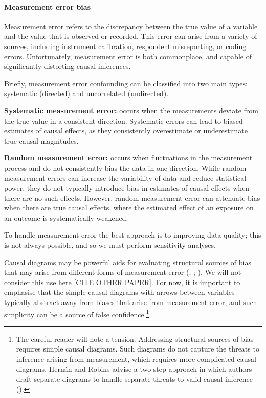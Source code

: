 \documentclass[
  singlecolumn,
  9pt]{article}
\let\oldparagraph\paragraph
\renewcommand{\paragraph}[1]{\oldparagraph{#1}\mbox{}}
\begin{document}
\paragraph{Measurement error bias}\label{measurement-error-bias}

Measurement error refers to the discrepancy between the true value of a
variable and the value that is observed or recorded. This error can
arise from a variety of sources, including instrument calibration,
respondent misreporting, or coding errors. Unfortunately, measurement
error is both commonplace, and capable of significantly distorting
causal inferences.

Briefly, measurement error confounding can be classified into two main
types: systematic (directed) and uncorrelated (undirected).

\textbf{Systematic measurement error:} occurs when the measurements
deviate from the true value in a consistent direction. Systematic errors
can lead to biased estimates of causal effects, as they consistently
overestimate or underestimate true causal magnitudes.

\textbf{Random measurement error:} occurs when fluctuations in the
measurement process and do not consistently bias the data in one
direction. While random measurement errors can increase the variability
of data and reduce statistical power, they do not typically introduce
bias in estimates of causal effects when there are no such effects.
However, random measurement error can attenuate bias when there are true
causal effects, where the estimated effect of an exposure on an outcome
is systematically weakened.

To handle measurement error the best approach is to improving data
quality; this is not always possible, and so we must perform sensitivity
analyses.

Causal diagrams may be powerful aids for evaluating structural sources
of bias that may arise from different forms of measurement error
(;
;
). We will
not consider this use here {[}CITE OTHER PAPER{]}. For now, it is
important to emphasise that the simple causal diagrams with arrows
between variables typically abstract away from biases that arise from
measurement error, and such simplicity can be a source of false
confidence.\footnote{The careful reader will note a tension. Addressing
  structural sources of bias requires simple causal diagrams. Such
  diagrams do not capture the threats to inference arising from
  measurement, which requires more complicated causal diagrams. Hernán
  and Robins advise a two step approach in which authors draft separate
  diagrams to handle separate threats to valid causal inference
  ().}
\end{document}
